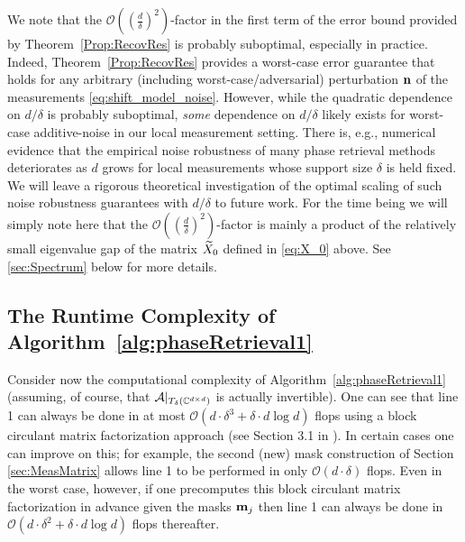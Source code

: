 We note that the  $\mathcal{O}\left( \left(\frac{d}{\delta} \right)^2 \right)$-factor in the first term of the error bound provided by Theorem~\ref{Prop:RecovRes} is probably suboptimal, especially in practice.  Indeed, Theorem~\ref{Prop:RecovRes} provides a worst-case error guarantee that holds for any arbitrary (including worst-case/adversarial) perturbation $\mathbf n$ of the measurements \eqref{eq:shift_model_noise}.  %
However, while the quadratic dependence on $d/\delta$ is probably suboptimal, \textit{some} dependence on $d/\delta$ likely exists for worst-case additive-noise in our local measurement setting.  There is, e.g., numerical evidence that the empirical noise robustness of many phase retrieval methods deteriorates as $d$ grows for local measurements whose support size $\delta$ is held fixed.  We will leave a rigorous theoretical investigation of the optimal scaling of such noise robustness guarantees with $d/\delta$ to future work.  For the time being we will simply note here that the $\mathcal{O}\left( \left(\frac{d}{\delta} \right)^2 \right)$-factor is mainly a product of the relatively small eigenvalue gap of the matrix $\widetilde{X}_0$ defined in \eqref{eq:X_0} above.  See \cref{sec:Spectrum} below for more details.

\subsection{The Runtime Complexity of Algorithm~\ref{alg:phaseRetrieval1}}
\label{sec:RuntimeAlg1}

Consider now the computational complexity of Algorithm~\ref{alg:phaseRetrieval1} (assuming, of course, that $\mathcal{A}|_{T_\delta(\mathbb{C}^{d\times d})}$ is actually invertible).  One can see that line 1 can  always be done in at most $\mathcal{O}(d \cdot \delta^3 + \delta \cdot d \log d)$ flops using a block circulant matrix factorization approach (see Section 3.1 in \cite{IVW2015_FastPhase}). In certain cases one can improve on this; for example, the second (new) mask construction of Section \ref{sec:MeasMatrix} allows line 1 to be performed in only $\mathcal{O}(d\cdot\delta)$ flops.  Even in the worst case, however, if one precomputes this block circulant matrix factorization in advance given the masks $\mathbf m_j$ then line 1 can always be done in $\mathcal{O}(d \cdot \delta^2 + \delta \cdot d \log d)$ flops thereafter.  

